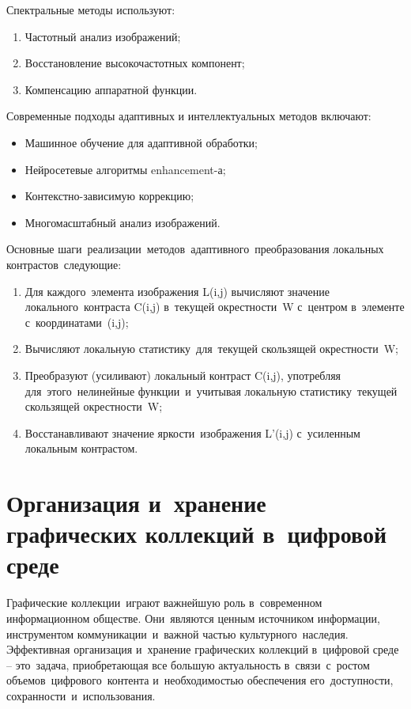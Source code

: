 \documentclass{ou}
\begin{document}
Спектральные методы используют:
\begin{enumerate}[leftmargin=0em, itemindent=3.75em, nosep, label=\arabic*)]
\item Частотный анализ изображений;
\item Восстановление высокочастотных компонент;
\item Компенсацию аппаратной функции\cite{exponenta}.
\end{enumerate}

Современные подходы адаптивных и интеллектуальных методов включают:
\begin{itemize}[label=-, leftmargin=0em, itemindent=3.35em, nosep]
\item Машинное обучение для адаптивной обработки;
\item Нейросетевые алгоритмы enhancement-а;
\item Контекстно-зависимую коррекцию;
\item Многомасштабный анализ изображений\cite{сyberleninka}.
\end{itemize}

Основные шаги~реализации~методов~адаптивного~преобразования локальных контрастов~следующие:
\begin{enumerate}[leftmargin=0em, itemindent=3.75em, nosep, label=\arabic*)]
\item Для каждого~элемента изображения L(i,j) вычисляют значение локального~контраста C(i,j) в~текущей окрестности~W с~центром в~элементе с~координатами~(i,j);
\item Вычисляют локальную статистику~для~текущей скользящей окрестности~W;
\item Преобразуют (усиливают) локальный контраст C(i,j), употребляя для~этого~нелинейные функции~и~учитывая локальную статистику~текущей скользящей окрестности~W;
\item Восстанавливают значение яркости~изображения L'(i,j) с~усиленным локальным контрастом\cite{Department_of_Nanosystems_and_Optotechnology2022}.
\end{enumerate}
\newpage
\section{Организация и~хранение графических коллекций в~цифровой среде}
Графические коллекции~играют важнейшую роль в~современном информационном обществе. Они~являются ценным источником информации, инструментом коммуникации~и~важной частью культурного~наследия. Эффективная организация и~хранение графических коллекций в~цифровой среде -- это~задача, приобретающая все большую актуальность в~связи~с~ростом объемов~цифрового~контента и~необходимостью обеспечения его~доступности, сохранности~и~использования.
\end{document}
